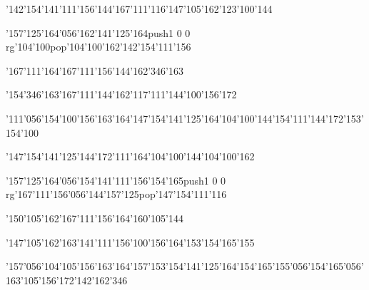 \null\vfill\ipa\centerline{\enskip\char'142\char'154\char'141\char'111\char'156\char'144\enskip\enskip\enskip\enskip\char'167\char'111\char'116\enskip\enskip\enskip\enskip\enskip\enskip\char'147\char'105\char'162\enskip\char'123\char'100\char'144}\medskip\centerline{\enskip\char'157\char'125\char'164\char'056\char'162\char'141\char'125\char'164\enskip\pdfcolorstack\match push{1 0 0 rg}\char'104\char'100\pdfcolorstack\match pop{}\enskip\char'104\char'100\char'162\enskip\enskip\enskip\enskip\enskip\char'142\char'154\char'111\char'156}\medskip\centerline{\enskip\char'167\char'111\char'164\enskip\enskip\enskip\enskip\char'167\char'111\char'156\char'144\enskip\enskip\enskip\char'162\char'346\char'163}\medskip\centerline{\enskip\enskip\enskip\enskip\char'154\char'346\char'163\enskip\char'167\char'111\char'144\enskip\char'162\char'117\char'111\char'144\enskip\char'100\char'156\char'172\enskip\enskip\enskip\enskip\enskip}\medskip\centerline{\enskip\char'111\char'056\char'154\char'100\char'156\char'163\char'164\enskip\enskip\enskip\char'147\char'154\char'141\char'125\char'164\enskip\char'104\char'100\char'144\enskip\enskip\enskip\char'154\char'111\char'144\char'172\enskip\char'153\char'154\char'100}\medskip\vfill\footline{\hfil\tt\folio\hfil}\eject
\null\vfill\ipa\centerline{\enskip\char'147\char'154\char'141\char'125\char'144\char'172\enskip\char'111\char'164\enskip\char'104\char'100\char'144\enskip\enskip\enskip\enskip\enskip\enskip\char'104\char'100\char'162\enskip\enskip\enskip\enskip}\medskip\centerline{\enskip\char'157\char'125\char'164\char'056\char'154\char'141\char'111\char'156\enskip\char'154\char'165\enskip\pdfcolorstack\match push{1 0 0 rg}\char'167\char'111\char'156\char'056\char'144\char'157\char'125\pdfcolorstack\match pop{}\enskip\char'147\char'154\char'111\char'116}\medskip\centerline{\enskip\char'150\char'105\char'162\enskip\enskip\enskip\enskip\char'167\char'111\char'156\char'164\enskip\enskip\enskip\char'160\char'105\char'144}\medskip\centerline{\enskip\enskip\enskip\enskip\char'147\char'105\char'162\enskip\enskip\enskip\enskip\enskip\char'163\char'141\char'111\char'156\enskip\char'100\char'156\char'164\enskip\char'153\char'154\char'165\char'155}\medskip\centerline{\enskip\char'157\char'056\char'104\char'105\char'156\char'163\char'164\enskip\char'157\enskip\char'153\char'154\char'141\char'125\char'164\enskip\char'154\char'165\char'155\char'056\char'154\char'165\char'056\char'163\char'105\char'156\char'172\enskip\char'142\char'162\char'346}\medskip\vfill\footline{\hfil\tt\folio\hfil}\eject
